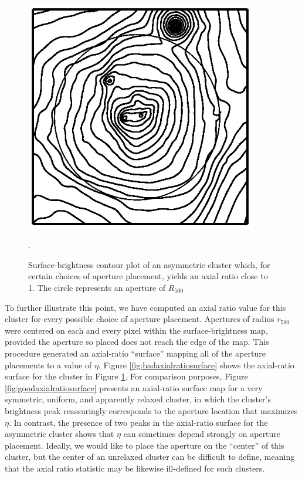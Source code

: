 \documentclass{aastex} \usepackage{natbib}
\begin{document}
\begin{figure}[b]
  \centering
  \includegraphics[width=0.9\textwidth,trim=15mm 0mm 0mm 0mm,
  clip]{f3.eps}
  \caption{Surface-brightness contour plot of an asymmetric cluster
    which, for certain choices of aperture placement, yields an axial
    ratio close to 1.  The circle represents an aperture of
    $R_{500}$}.
  \label{fig:badaxialratio}
\end{figure}

To further illustrate this point, we have computed an axial ratio
value for this cluster for every possible choice of aperture
placement.  Apertures of radius $r_{500}$ were centered on each and
every pixel within the surface-brightness map, provided the aperture
so placed does not reach the edge of the map.  This procedure
generated an axial-ratio ``surface'' mapping all of the aperture
placements to a value of $\eta$.  Figure
\ref{fig:badaxialratiosurface} shows the axial-ratio surface for the
cluster in Figure \ref{fig:badaxialratio}.  For comparison purposes,
Figure \ref{fig:goodaxialratiosurface} presents an axial-ratio surface
map for a very symmetric, uniform, and apparently relaxed cluster, in
which the cluster's brightness peak reassuringly corresponds to the
aperture location that maximizes $\eta$.  In contrast, the presence of
two peaks in the axial-ratio surface for the asymmetric cluster shows
that $\eta$ can sometimes depend strongly on aperture placement.
Ideally, we would like to place the aperture on the ``center'' of this
cluster, but the center of an unrelaxed cluster can be difficult to
define, meaning that the axial ratio statistic may be likewise
ill-defined for such clusters.
\end{document}
